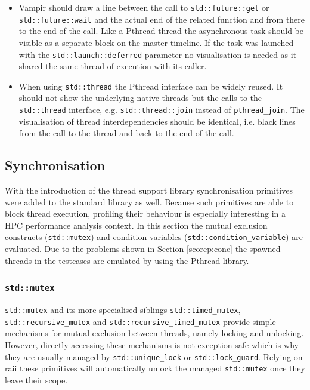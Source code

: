 \begin{itemize}
\item Vampir should draw a line between the call to \texttt{std::future::get} or \texttt{std::future::wait} and the actual end of the related function and from there to the end of the call. Like a Pthread thread the asynchronous task should be visible as a separate block on the master timeline. If the task was launched with the \texttt{std::launch::deferred} parameter no visualisation is needed as it shared the same thread of execution with its caller.
\item When using \texttt{std::thread} the Pthread interface can be widely reused. It should not show the underlying native threads but the calls to the \texttt{std::thread} interface, e.g. \texttt{std::thread::join} instead of \texttt{pthread\_join}. The visualisation of thread interdependencies should be identical, i.e. black lines from the call to the thread and back to the end of the call.
\end{itemize}

\subsection{Synchronisation}

With the introduction of the thread support library synchronisation primitives were added to the standard library as well. Because such primitives are able to block thread execution, profiling their behaviour is especially interesting in a HPC performance analysis context. In this section the mutual exclusion constructs (\texttt{std::mutex}) and condition variables (\texttt{std::condition\_variable}) are evaluated. Due to the problems shown in Section \ref{scorep:conc} the spawned threads in the testcases are emulated by using the Pthread library.

\subsubsection{\texttt{std::mutex}}\label{scorep:sync:mutex}

\texttt{std::mutex} and its more specialised siblings \texttt{std::timed\_mutex}, \texttt{std::recursive\_mutex} and \texttt{std::recursive\_timed\_mutex} provide simple mechanisms for mutual exclusion between threads, namely locking and unlocking. However, directly accessing these mechanisms is not exception-safe which is why they are usually managed by \texttt{std::unique\_lock} or \texttt{std::lock\_guard}. Relying on \gls{raii} these primitives will automatically unlock the managed \texttt{std::mutex} once they leave their scope.

